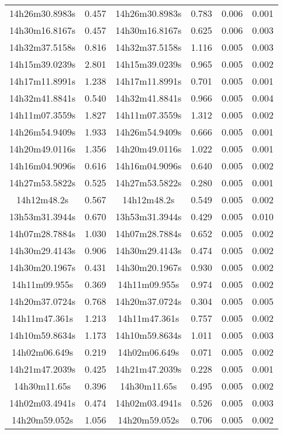 \begin{table}
\begin{tabular}{cccccc}
14h26m30.8983s & 0.457 & 14h26m30.8983s & 0.783 & 0.006 & 0.001 \\
14h30m16.8167s & 0.457 & 14h30m16.8167s & 0.625 & 0.006 & 0.003 \\
14h32m37.5158s & 0.816 & 14h32m37.5158s & 1.116 & 0.005 & 0.003 \\
14h15m39.0239s & 2.801 & 14h15m39.0239s & 0.965 & 0.005 & 0.002 \\
14h17m11.8991s & 1.238 & 14h17m11.8991s & 0.701 & 0.005 & 0.001 \\
14h32m41.8841s & 0.540 & 14h32m41.8841s & 0.966 & 0.005 & 0.004 \\
14h11m07.3559s & 1.827 & 14h11m07.3559s & 1.312 & 0.005 & 0.002 \\
14h26m54.9409s & 1.933 & 14h26m54.9409s & 0.666 & 0.005 & 0.001 \\
14h20m49.0116s & 1.356 & 14h20m49.0116s & 1.022 & 0.005 & 0.001 \\
14h16m04.9096s & 0.616 & 14h16m04.9096s & 0.640 & 0.005 & 0.002 \\
14h27m53.5822s & 0.525 & 14h27m53.5822s & 0.280 & 0.005 & 0.001 \\
14h12m48.2s & 0.567 & 14h12m48.2s & 0.549 & 0.005 & 0.002 \\
13h53m31.3944s & 0.670 & 13h53m31.3944s & 0.429 & 0.005 & 0.010 \\
14h07m28.7884s & 1.030 & 14h07m28.7884s & 0.652 & 0.005 & 0.002 \\
14h30m29.4143s & 0.906 & 14h30m29.4143s & 0.474 & 0.005 & 0.002 \\
14h30m20.1967s & 0.431 & 14h30m20.1967s & 0.930 & 0.005 & 0.002 \\
14h11m09.955s & 0.369 & 14h11m09.955s & 0.974 & 0.005 & 0.002 \\
14h20m37.0724s & 0.768 & 14h20m37.0724s & 0.304 & 0.005 & 0.005 \\
14h11m47.361s & 1.213 & 14h11m47.361s & 0.757 & 0.005 & 0.002 \\
14h10m59.8634s & 1.173 & 14h10m59.8634s & 1.011 & 0.005 & 0.003 \\
14h02m06.649s & 0.219 & 14h02m06.649s & 0.071 & 0.005 & 0.002 \\
14h21m47.2039s & 0.425 & 14h21m47.2039s & 0.228 & 0.005 & 0.001 \\
14h30m11.65s & 0.396 & 14h30m11.65s & 0.495 & 0.005 & 0.002 \\
14h02m03.4941s & 0.474 & 14h02m03.4941s & 0.526 & 0.005 & 0.003 \\
14h20m59.052s & 1.056 & 14h20m59.052s & 0.706 & 0.005 & 0.002 \\

\end{tabular}
\end{table}
